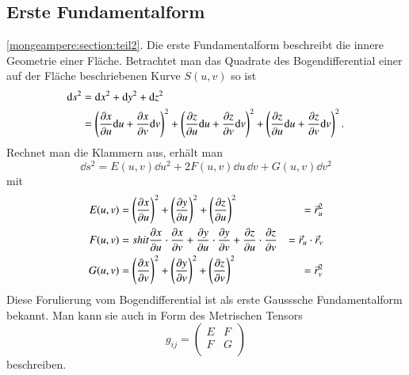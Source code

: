 \subsection{Erste Fundamentalform
\label{mongeampere:subsection:finibus}}
\ref{mongeampere:section:teil2}.
Die erste Fundamentalform beschreibt die innere Geometrie einer Fläche.
Betrachtet man das Quadrate des Bogendifferential einer auf der Fläche 
beschriebenen Kurve $S(u,v)$ so ist 
\begin{equation}
  \begin{split}
    \dd s^2 &= \dd x^2 + \dd y^2 + \dd z^2 \\
          &= \left(\pdv{x}{u}\dd u + \pdv{x}{v}\dd v  \right)^2
          + \left(\pdv{z}{u}\dd u + \pdv{z}{v}\dd v  \right)^2
          + \left(\pdv{z}{u}\dd u + \pdv{z}{v}\dd v  \right)^2.
  \end{split}
  \label{mongeampere:bogdiff}
\end{equation}
Rechnet man die Klammern aus, erhält man 
\begin{equation}
    \dd s^2 = E(u,v) \dd u^2 + 2F(u,v) \dd u \, \dd v + G(u,v)\dd v^2
    \label{mongeampere:1fundform}
\end{equation}
mit
\begin{align}
     E(u,v) &= \left(\pdv{x}{u} \right)^2 +
     \left(\pdv{y}{u} \right)^2 +
     \left(\pdv{z}{u} \right)^2 
            &= \vec r_u^2\\
     F(u,v) &= shit
     \pdv{x}{u} \cdot \pdv{x}{v} +
     \pdv{y}{u} \cdot \pdv{y}{v} +
     \pdv{z}{u} \cdot \pdv{z}{v}
            &= \vec r_u \cdot \vec r_v \\
      G(u,v) &= \left(\pdv{x}{v} \right)^2 +
     \left(\pdv{y}{v} \right)^2 +
     \left(\pdv{z}{v} \right)^2 
             &= \vec r_v ^2\\
  \label{mongeampere:1fundbed}
\end{align}
Diese Forulierung vom Bogendifferential ist als erste Gausssche Fundamentalform bekannt.
Man kann sie auch in Form des Metrischen Tensors 
\begin{equation}
  g_{ij} = \begin{pmatrix}
    E & F \\
    F & G \\
  \end{pmatrix}
  \label{mongeampere:erstmettens}
\end{equation}
beschreiben.

